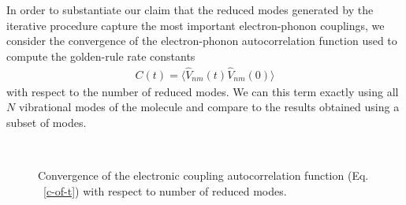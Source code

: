 In order to substantiate our claim that the reduced modes generated by the iterative
procedure capture the most important electron-phonon couplings, we consider the
convergence of the electron-phonon autocorrelation function used
to compute the golden-rule rate constants
\begin{eqnarray}
C(t) = \langle \hat V_{nm}(t) \hat V_{nm}(0)\rangle \label{c-of-t}
\end{eqnarray}
with respect to the number of reduced modes.  We
can  this term exactly using all $N$ vibrational modes of the molecule and
compare to the results obtained using a subset of modes.

\begin{figure}[t]
\\
\caption{Convergence of the electronic coupling autocorrelation function (Eq. ~\ref{c-of-t})
with respect to number of reduced modes.\label{firstmodecorr}}
\end{figure}

